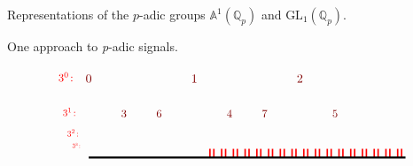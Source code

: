 \documentclass[letterpaper,11pt, reqno]{amsart}
\newtheorem{monodromy theorem}{Monodromy Theorem}[subsection]
\newtheorem{wild conjecture}[theorem]{Wild Conjecture}
\newtheorem{research objectives}{Research objectives}[subsection]
\newtheorem{research question}[theorem]{Research questions}
\newtheorem{aside question}[theorem]{Aside question}
\newtheorem{audio example}[theorem]{\loudspeaker[3] Example}
\newtheorem{blank remark}[theorem]{}
\newtheorem{terminology and comment}[theorem]{Terminology and comment}
\newtheorem{purity hypothesis}[theorem]{Purity hypothesis}
\newtheorem{corollary of the purity hypothesis}[theorem]{Corollary of the purity hypothesis}
\numberwithin{equation}{theorem}
\begin{document}
\begin{section}{Representations of the $p$-adic groups $\mathbb{A}^{\!1}(\mathbb{Q}_{p})$ and $\text{GL}_{1}(\mathbb{Q}_{p})$.}
\begin{subsection}{One approach to {\em p}-adic signals.}
\begin{figure}[ht]
$$\begin{tikzpicture}
	\draw[red, very thick] (10/3+1/9,0) -- (10/3+1/9,.25);
	\draw[red, very thick] (10/3+2/9,0) -- (10/3+2/9,.25);
	\draw[red, very thick] (11/3+1/9,0) -- (11/3+1/9,.25);
	\draw[red, very thick] (11/3+2/9,0) -- (11/3+2/9,.25);
	\draw[red, very thick] (12/3+1/9,0) -- (12/3+1/9,.25);
	\draw[red, very thick] (12/3+2/9,0) -- (12/3+2/9,.25);
	\draw[red, very thick] (13/3+1/9,0) -- (13/3+1/9,.25);
	\draw[red, very thick] (13/3+2/9,0) -- (13/3+2/9,.25);
	\draw[red, very thick] (14/3+1/9,0) -- (14/3+1/9,.25);
	\draw[red, very thick] (14/3+2/9,0) -- (14/3+2/9,.25);
	\draw[red, very thick] (15/3+1/9,0) -- (15/3+1/9,.25);
	\draw[red, very thick] (15/3+2/9,0) -- (15/3+2/9,.25);
	\draw[red, very thick] (16/3+1/9,0) -- (16/3+1/9,.25);
	\draw[red, very thick] (16/3+2/9,0) -- (16/3+2/9,.25);
	\draw[red, very thick] (17/3+1/9,0) -- (17/3+1/9,.25);
	\draw[red, very thick] (17/3+2/9,0) -- (17/3+2/9,.25);
	\draw[red, very thick] (18/3+1/9,0) -- (18/3+1/9,.25);
	\draw[red, very thick] (18/3+2/9,0) -- (18/3+2/9,.25);
	\draw[red, very thick] (19/3+1/9,0) -- (19/3+1/9,.25);
	\draw[red, very thick] (19/3+2/9,0) -- (19/3+2/9,.25);
	\draw[red, very thick] (20/3+1/9,0) -- (20/3+1/9,.25);
	\draw[red, very thick] (20/3+2/9,0) -- (20/3+2/9,.25);
	\draw[red, very thick] (21/3+1/9,0) -- (21/3+1/9,.25);
	\draw[red, very thick] (21/3+2/9,0) -- (21/3+2/9,.25);
	\draw[red, very thick] (22/3+1/9,0) -- (22/3+1/9,.25);
	\draw[red, very thick] (22/3+2/9,0) -- (22/3+2/9,.25);
	\draw[red, very thick] (23/3+1/9,0) -- (23/3+1/9,.25);
	\draw[red, very thick] (23/3+2/9,0) -- (23/3+2/9,.25);
	\draw[red, very thick] (24/3+1/9,0) -- (24/3+1/9,.25);
	\draw[red, very thick] (24/3+2/9,0) -- (24/3+2/9,.25);
	\draw[red, very thick] (25/3+1/9,0) -- (25/3+1/9,.25);
	\draw[red, very thick] (25/3+2/9,0) -- (25/3+2/9,.25);
	\draw[red, very thick] (26/3+1/9,0) -- (26/3+1/9,.25);
	\draw[red, very thick] (26/3+2/9,0) -- (26/3+2/9,.25);
	\draw[black, ultra thick] (0,0) -- (9,0);
	\node[red] at (-.65,2.3) {\scalebox{.9}{$3^0\!:$}};
	\node[red] at (-.55,1.3) {\scalebox{.8}{$3^1\!:$}};
	\node[red] at (-.45,.7) {\scalebox{.7}{$3^2\!:$}};
	\node[red] at (-.35,.35) {\scalebox{.5}{$3^3\!:$}};
	\node[red!50!black!100] at (0,2.25) {\scalebox{1}{$0$}};
	\node[red!50!black!100] at (3,2.25) {\scalebox{1}{$1$}};
	\node[red!50!black!100] at (6,2.25) {\scalebox{1}{$2$}};
	\node[red!50!black!100] at (1,1.25) {\scalebox{.9}{$3$}};
	\node[red!50!black!100] at (2,1.25) {\scalebox{.9}{$6$}};
	\node[red!50!black!100] at (4,1.25) {\scalebox{.9}{$4$}};
	\node[red!50!black!100] at (5,1.25) {\scalebox{.9}{$7$}};
	\node[red!50!black!100] at (7,1.25) {\scalebox{.9}{$5$}};

\end{tikzpicture}$$
\end{figure}
\end{subsection}
\end{section}
\end{document}
